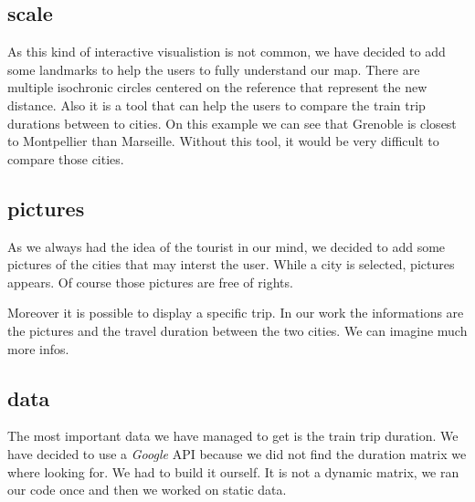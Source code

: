 \subsection{scale}
As this kind of interactive visualistion is not common, we have decided to add some landmarks to help the users to fully understand our map. There are multiple isochronic circles centered on the reference that represent the new distance. Also it is a tool that can help the users to compare the train trip durations between to cities.
On this example we can see that Grenoble is closest to Montpellier than Marseille. Without this tool, it would be very difficult to compare those cities.
\picture



\subsection{pictures}
As we always had the idea of the tourist in our mind, we decided to add some pictures of the cities that may interst the user. While a city is selected, pictures appears. Of course those pictures are free of rights.

Moreover it is possible to display a specific trip. In our work the informations are the pictures and the travel duration between the two cities. We can imagine much more infos.

\subsection{data}
The most important data we have managed to get is the train trip duration. We have decided to use a \textit{Google} API because we did not find the duration matrix we where looking for. We had to build it ourself. It is not a dynamic matrix, we ran our code once and then we worked on static data.













